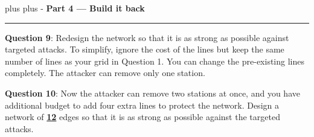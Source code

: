 \documentclass[a4paper, 14pt]{extarticle}
\newcommand{\needroom}[1]{%
  \par
  \begingroup
    \setlength{\dimen0}{#1}%
    \vskip 0pt plus \dimen0
    \penalty -100%
    \vskip 0pt plus -\dimen0
  \endgroup}
\newcommand{\parthead}[2]{%
  \needroom{6\baselineskip}%
  \partheadhere{#1}{#2}}
\newcommand{\partheadhere}[2]{%
  \vspace{0.5em}
  {\large\bfseries Part #1 --- #2}\par
  \vspace{-0.4em}\rule{\textwidth}{0.8pt}\par
  \vspace{0.1em}}
\begin{document}
\parthead{4}{Build it back}

\begin{minipage}{\textwidth}
{\bf Question 9}:
Redesign the network so that it is as strong as possible against targeted attacks.
To simplify, ignore the cost of the lines but keep the same number of lines as your grid in Question 1.
You can change the pre-existing lines completely.
The attacker can remove only one station.

\begin{center}
\end{center}
\end{minipage}

\begin{minipage}{\textwidth}
{\bf Question 10}:
Now the attacker can remove two stations at once, and you have additional budget to add four extra lines to protect the network.
Design a network of \underline{\textbf{12}} edges so that it is as strong as possible against the targeted attacks.

\begin{center}
\end{center}
\end{minipage}
\end{document}
